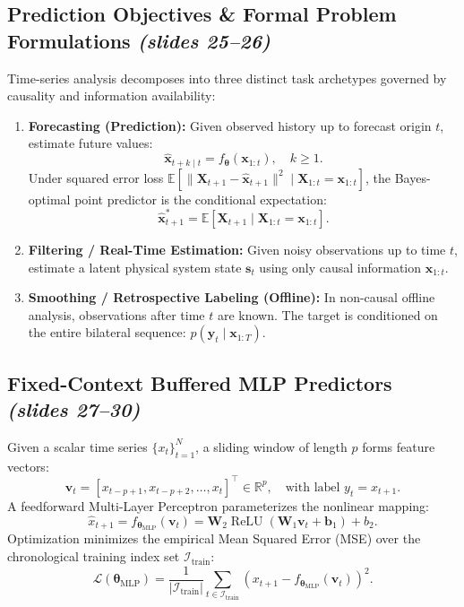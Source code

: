 \documentclass[11pt,a4paper]{article}
\theoremstyle{definition}
\theoremstyle{plain}
\begin{document}
\subsection{Prediction Objectives \& Formal Problem Formulations \emph{(slides 25--26)}}
Time-series analysis decomposes into three distinct task archetypes governed by causality and information availability:
\begin{enumerate}
    \item \textbf{Forecasting (Prediction):} Given observed history up to forecast origin $t$, estimate future values:
    \begin{equation}
        \hat{\mathbf{x}}_{t+k \mid t} = f_{\boldsymbol{\theta}}(\mathbf{x}_{1:t}), \quad k \ge 1.
    \end{equation}
    Under squared error loss $\mathbb{E}[\|\mathbf{X}_{t+1} - \hat{\mathbf{x}}_{t+1}\|^2 \mid \mathbf{X}_{1:t} = \mathbf{x}_{1:t}]$, the Bayes-optimal point predictor is the conditional expectation:
    \begin{equation}
        \hat{\mathbf{x}}_{t+1}^* = \mathbb{E}[\mathbf{X}_{t+1} \mid \mathbf{X}_{1:t} = \mathbf{x}_{1:t}].
    \end{equation}
    \item \textbf{Filtering / Real-Time Estimation:} Given noisy observations up to time $t$, estimate a latent physical system state $\mathbf{s}_t$ using only causal information $\mathbf{x}_{1:t}$.
    \item \textbf{Smoothing / Retrospective Labeling (Offline):} In non-causal offline analysis, observations after time $t$ are known. The target is conditioned on the entire bilateral sequence: $p(\mathbf{y}_t \mid \mathbf{x}_{1:T})$.
\end{enumerate}

\subsection{Fixed-Context Buffered MLP Predictors \emph{(slides 27--30)}}
Given a scalar time series $\{x_t\}_{t=1}^N$, a sliding window of length $p$ forms feature vectors:
\begin{equation}
    \mathbf{v}_t = [x_{t-p+1}, x_{t-p+2}, \dots, x_t]^\top \in \mathbb{R}^p, \quad \text{with label } y_t = x_{t+1}.
\end{equation}
A feedforward Multi-Layer Perceptron parameterizes the nonlinear mapping:
\begin{equation}
    \hat{x}_{t+1} = f_{\boldsymbol{\theta}_{\text{MLP}}}(\mathbf{v}_t) = \mathbf{W}_2 \operatorname{ReLU}(\mathbf{W}_1 \mathbf{v}_t + \mathbf{b}_1) + b_2.
\end{equation}
Optimization minimizes the empirical Mean Squared Error (MSE) over the chronological training index set $\mathcal{I}_{\text{train}}$:
\begin{equation}
    \mathcal{L}(\boldsymbol{\theta}_{\text{MLP}}) = \frac{1}{|\mathcal{I}_{\text{train}}|} \sum_{t \in \mathcal{I}_{\text{train}}} (x_{t+1} - f_{\boldsymbol{\theta}_{\text{MLP}}}(\mathbf{v}_t))^2.
\end{equation}
\end{document}
